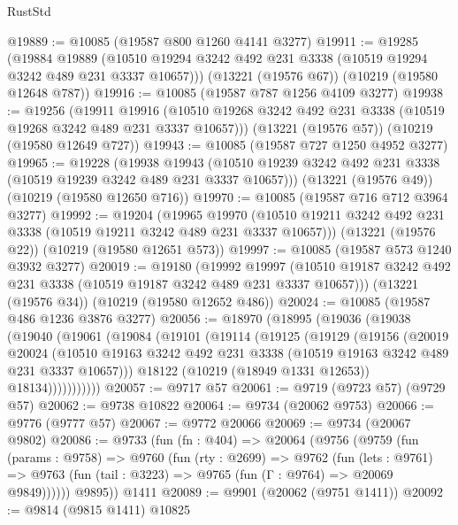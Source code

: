 \begin{lexlean}{RustStd}
\begin{coremodule}
@19889 := @10085 (@19587 @800 @1260 @4141 @3277)
@19911 := @19285
    (@19884
      @19889
      (@10510 @19294 @3242 @492 @231 @3338 (@10519 @19294 @3242 @489 @231 @3337 @10657)))
    (@13221 (@19576 @67))
    (@10219 (@19580 @12648 @787))
@19916 := @10085 (@19587 @787 @1256 @4109 @3277)
@19938 := @19256
    (@19911
      @19916
      (@10510 @19268 @3242 @492 @231 @3338 (@10519 @19268 @3242 @489 @231 @3337 @10657)))
    (@13221 (@19576 @57))
    (@10219 (@19580 @12649 @727))
@19943 := @10085 (@19587 @727 @1250 @4952 @3277)
@19965 := @19228
    (@19938
      @19943
      (@10510 @19239 @3242 @492 @231 @3338 (@10519 @19239 @3242 @489 @231 @3337 @10657)))
    (@13221 (@19576 @49))
    (@10219 (@19580 @12650 @716))
@19970 := @10085 (@19587 @716 @712 @3964 @3277)
@19992 := @19204
    (@19965
      @19970
      (@10510 @19211 @3242 @492 @231 @3338 (@10519 @19211 @3242 @489 @231 @3337 @10657)))
    (@13221 (@19576 @22))
    (@10219 (@19580 @12651 @573))
@19997 := @10085 (@19587 @573 @1240 @3932 @3277)
@20019 := @19180
    (@19992
      @19997
      (@10510 @19187 @3242 @492 @231 @3338 (@10519 @19187 @3242 @489 @231 @3337 @10657)))
    (@13221 (@19576 @34))
    (@10219 (@19580 @12652 @486))
@20024 := @10085 (@19587 @486 @1236 @3876 @3277)
@20056 := @18970
    (@18995
      (@19036
        (@19038
          (@19040
            (@19061
              (@19084
                (@19101
                  (@19114
                    (@19125
                      (@19129
                        (@19156
                          (@20019
                            @20024
                            (@10510
                              @19163
                              @3242
                              @492
                              @231
                              @3338
                              (@10519 @19163 @3242 @489 @231 @3337 @10657)))
                          @18122
                          (@10219 (@18949 @1331 @12653))
                          @18134)))))))))))
@20057 := @9717 @57
@20061 := @9719 (@9723 @57) (@9729 @57)
@20062 := @9738 @10822
@20064 := @9734 (@20062 @9753)
@20066 := @9776 (@9777 @57)
@20067 := @9772 @20066
@20069 := @9734 (@20067 @9802)
@20086 := @9733
    (fun (fn : @404) =>
    @20064
      (@9756
        (@9759
          (fun (params : @9758) =>
          @9760
            (fun (rty : @2699) =>
            @9762
              (fun (lets : @9761) =>
              @9763 (fun (tail : @3223) => @9765 (fun (Γ : @9764) => @20069 @9849))))))
        @9895))
    @1411
@20089 := @9901 (@20062 (@9751 @1411))
@20092 := @9814 (@9815 @1411) @10825

\end{coremodule}
\end{lexlean}
